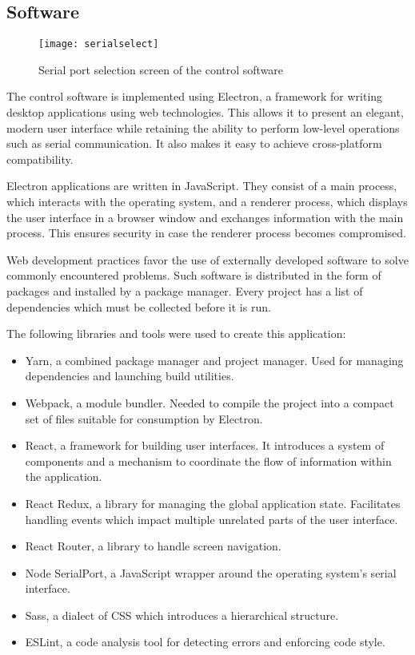 \clearpage
\subsection{Software}

\begin{figure}[ht]
    \begin{center}
        \texttt{[image: serialselect]}
        \caption{Serial port selection screen of the control software}
        \label{serialselect}
    \end{center}
\end{figure}

The control software is implemented using Electron, a framework for writing
desktop applications using web technologies. This allows it to present an
elegant, modern user interface while retaining the ability to perform low-level
operations such as serial communication. It also makes it easy to achieve
cross-platform compatibility.

Electron applications are written in JavaScript. They consist of a main process,
which interacts with the operating system, and a renderer process, which
displays the user interface in a browser window and exchanges information with
the main process. This ensures security in case the renderer process becomes
compromised.

Web development practices favor the use of externally developed software to
solve commonly encountered problems. Such software is distributed in the form of
packages and installed by a package manager. Every project has a list of
dependencies which must be collected before it is run.

The following libraries and tools were used to create this application:

\begin{itemize}
    \item Yarn, a combined package manager and project manager. Used for
    managing dependencies and launching build utilities.
    \item Webpack, a module bundler. Needed to compile the project into a
    compact set of files suitable for consumption by Electron.
    \item React, a framework for building user interfaces. It introduces a
    system of components and a mechanism to coordinate the flow of information
    within the application.
    \item React Redux, a library for managing the global application state.
    Facilitates handling events which impact multiple unrelated parts of the
    user interface.
    \item React Router, a library to handle screen navigation.
    \item Node SerialPort, a JavaScript wrapper around the operating system's
    serial interface.
    \item Sass, a dialect of CSS which introduces a hierarchical structure.
    \item ESLint, a code analysis tool for detecting errors and enforcing code
    style.
\end{itemize}

